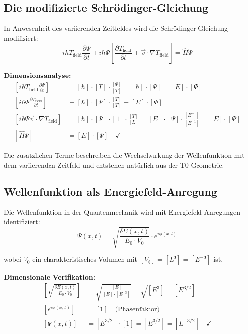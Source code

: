 \documentclass[12pt,a4paper]{report}
\begin{document}
\subsection{Die modifizierte Schrödinger-Gleichung}

In Anwesenheit des variierenden Zeitfeldes wird die Schrödinger-Gleichung modifiziert:
\begin{equation}
	\boxed{i\hbar T_{\text{field}} \frac{\partial\Psi}{\partial t} + i\hbar\Psi\left[\frac{\partial T_{\text{field}}}{\partial t} + \vec{v} \cdot \nabla T_{\text{field}}\right] = \hat{H}\Psi}
	\label{eq:modified_schrodinger}
\end{equation}

\textbf{Dimensionsanalyse:}
\begin{align}
	\left[i\hbar T_{\text{field}} \frac{\partial\Psi}{\partial t}\right] &= [\hbar] \cdot [T] \cdot \frac{[\Psi]}{[T]} = [\hbar] \cdot [\Psi] = [E] \cdot [\Psi] \\
	\left[i\hbar\Psi\frac{\partial T_{\text{field}}}{\partial t}\right] &= [\hbar] \cdot [\Psi] \cdot \frac{[T]}{[T]} = [E] \cdot [\Psi] \\
	\left[i\hbar\Psi\vec{v} \cdot \nabla T_{\text{field}}\right] &= [\hbar] \cdot [\Psi] \cdot [1] \cdot \frac{[T]}{[L]} = [E] \cdot [\Psi] \cdot \frac{[E^{-1}]}{[E^{-1}]} = [E] \cdot [\Psi] \\
	[\hat{H}\Psi] &= [E] \cdot [\Psi] \quad \checkmark
\end{align}

Die zusätzlichen Terme beschreiben die Wechselwirkung der Wellenfunktion mit dem variierenden Zeitfeld und entstehen natürlich aus der T0-Geometrie.

\subsection{Wellenfunktion als Energiefeld-Anregung}

Die Wellenfunktion in der Quantenmechanik wird mit Energiefeld-Anregungen identifiziert:
\begin{equation}
	\Psi(x,t) = \sqrt{\frac{\delta E(x,t)}{E_0 \cdot V_0}} \cdot e^{i\phi(x,t)}
\end{equation}

wobei $V_0$ ein charakteristisches Volumen mit $[V_0] = [L^3] = [E^{-3}]$ ist.

\textbf{Dimensionale Verifikation:}
\begin{align}
	\left[\sqrt{\frac{\delta E(x,t)}{E_0 \cdot V_0}}\right] &= \sqrt{\frac{[E]}{[E] \cdot [E^{-3}]}} = \sqrt{[E^3]} = [E^{3/2}] \\
	[e^{i\phi(x,t)}] &= [1] \quad \text{(Phasenfaktor)} \\
	[\Psi(x,t)] &= [E^{3/2}] \cdot [1] = [E^{3/2}] = [L^{-3/2}] \quad \checkmark
\end{align}
\end{document}
